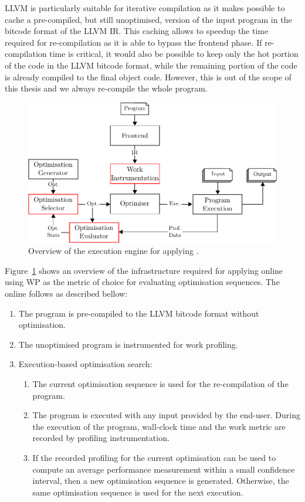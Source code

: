 LLVM is particularly suitable for iterative compilation as it makes possible to cache a pre-compiled, but still unoptimised, version of the input program in the bitcode format of the LLVM IR.  
This caching allows to speedup the time required for re-compilation as it is able to bypass the frontend phase.
If re-compilation time is critical, it would also be possible to keep only the hot portion of the code in the LLVM bitcode format, while the remaining portion of the code is already compiled to the final object code.
However, this is out of the scope of this thesis and we always re-compile the whole program.

\begin{figure}[htb]
    \centering
    \includegraphics[width=\linewidth]{figs/infra-diagram}
    \caption{Overview of the execution engine for applying {\itercomp}.}
    \label{fig:infra-diagram}
\end{figure}

Figure~\ref{fig:infra-diagram} shows an overview of the infrastructure required for applying online {\itercomp}
using WP as the metric of choice for evaluating optimisation sequences.
The online {\itercomp} follows as described bellow:
\begin{enumerate}
\item The program is pre-compiled to the LLVM bitcode format without optimisation.
\item The unoptimised program is instrumented for work profiling.
\item Execution-based optimisation search:
 \begin{enumerate}
   \item The current optimisation sequence is used for the re-compilation of the program.
   \item The program is executed with any input provided by the end-user.
         During the execution of the program, wall-clock time and the work metric are recorded by profiling instrumentation.
   \item If the recorded profiling for the current optimisation can be used to compute an average performance measurement within a small confidence interval,
         then a new optimisation sequence is generated.
         Otherwise, the same optimisation sequence is used for the next execution.
 \end{enumerate}
\end{enumerate}

